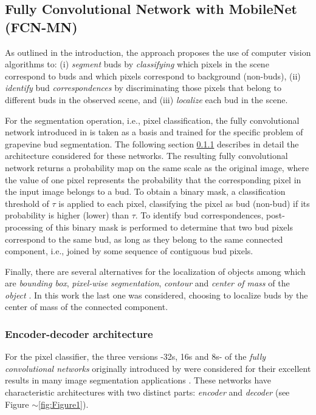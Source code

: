 \documentclass[a4paper,authoryear,review]{elsarticle}
\begin{document}
	\subsection{Fully Convolutional Network with MobileNet (FCN-MN)}
	\label{sec:fcn}
	
	As outlined in the introduction, the approach proposes the use of computer vision algorithms to: (i) \emph{segment} buds by \emph{classifying} which pixels in the scene correspond to buds and which pixels correspond to background (non-buds), (ii) \emph{identify} bud \emph{correspondences} by discriminating those pixels that belong to different buds in the observed scene, and (iii) \emph{localize} each bud in the scene. 
	
	For the segmentation operation, i.e., pixel classification, the fully convolutional network introduced in \citep{long2015fully} is taken as a basis and trained for the specific problem of grapevine bud segmentation. The following section  \ref{sec:fcnmn} describes in detail the architecture considered for these networks. The resulting fully convolutional network returns a probability map on the same scale as the original image, where the value of one pixel represents the probability that the corresponding pixel in the input image belongs to a bud. To obtain a binary mask, a classification threshold of $\tau$ is applied to each pixel, classifying the pixel as bud (non-bud) if its probability is higher (lower) than $\tau$. To identify bud correspondences, post-processing of this binary mask is performed to determine that two bud pixels correspond to the same bud, as long as they belong to the same connected component, i.e., joined by some sequence of contiguous bud pixels. 
	
	Finally, there are several alternatives for the localization of objects among which are \emph{bounding box}, \emph{pixel-wise segmentation}, \emph{contour} and \emph{center of mass} of the \emph{object} \citep{lampert2008beyond}. In this work the last one was considered, choosing to localize buds by the center of mass of the connected component. 
	
	\subsubsection {Encoder-decoder architecture}
	\label{sec:fcnmn}
	
	For the pixel classifier, the three versions -32s, 16s and 8s-  of the \emph{fully convolutional networks} originally introduced by \citet{long2015fully} were considered for their excellent results in many image segmentation applications \citep{litjens2017survey, garcia2018survey, kaymak2019brief}. These networks have characteristic architectures with two distinct parts: \emph{encoder} and \emph{decoder} (see Figure $\sim$\ref{fig:Figure1}). 
	
\end{document}
